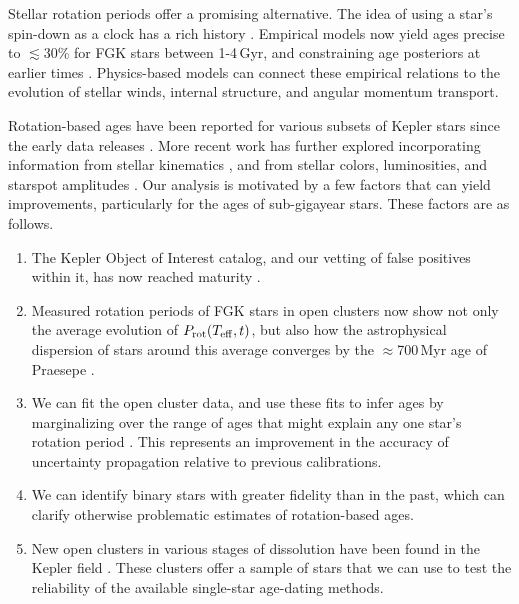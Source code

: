 \documentclass[11pt,twocolumn,tighten]{aastex63}
\begin{document}
Stellar rotation periods offer a promising alternative.  The idea of
using a star's spin-down as a clock has a rich history
\citep{Skumanich_1972,Noyes_1984,Kawaler_1989,Barnes03,Mamajek_2008,Angus_2015}.
Empirical models now yield ages precise to $\lesssim$30\% for FGK stars
between 1-4\,Gyr, and constraining age posteriors at earlier times
\citep{Bouma_2023}.  Physics-based models
\citep{Matt_2015,Gallet_Bouvier_2015,Spada_2020} can 
connect these empirical relations to the evolution of stellar winds,
internal structure, and angular momentum transport.

Rotation-based ages have been reported for
various subsets of Kepler stars since the early data releases
\citep[e.g.][]{Walkowicz_2013,McQuillan_2014,Reinhold_2015,Angus_2018}.
More recent work has further explored incorporating information from
stellar kinematics \citep{2021AJ....161..189L,2024AJ....167..159L},
and from stellar colors, luminosities, and starspot amplitudes
\citep{2023ApJ...952..131M}.  Our analysis is motivated by a few
factors that can yield improvements, particularly for the ages of
sub-gigayear stars.   These factors are as follows.

\begin{enumerate}[label={\it \roman*)},leftmargin=12pt,topsep=0pt,itemsep=-1ex,partopsep=1ex,parsep=1ex]
  \item The Kepler Object of Interest catalog, and our vetting of
    false positives within it, has now reached maturity
    \citep[e.g.][]{Thompson_2018}.
  \item Measured rotation periods of FGK stars in open clusters now
    show not only the average evolution of $P_{\rm rot}(T_{\rm eff},t)$,
    but also how the astrophysical dispersion of stars around this average
    converges by the $\approx$700\,Myr age of Praesepe
    \citep[e.g.][]{Curtis_2019_ngc6811,Gillen_2020,Rampalli_2021,Fritzewski_2021,Rebull_2022,Dungee_2022,2023AJ....166...14B}.
  \item We can fit the open cluster data, and use these fits to infer
    ages by marginalizing over the range of ages that might explain
    any one star's rotation period \citep{Bouma_2023}.
    This represents an improvement in the accuracy 
    of uncertainty propagation relative to previous calibrations.
  \item We can identify binary stars with greater fidelity than
    in the past, which can clarify otherwise problematic estimates of
    rotation-based ages.
  \item New open clusters in various stages of dissolution have been
    found in the Kepler field
    \cite[e.g.][]{2019AJ....158..122K,Bouma_2022b,Barber_2022}.
    These clusters offer a sample of stars that we can use to test
    the reliability of the available single-star age-dating methods.
\end{enumerate}
\end{document}
